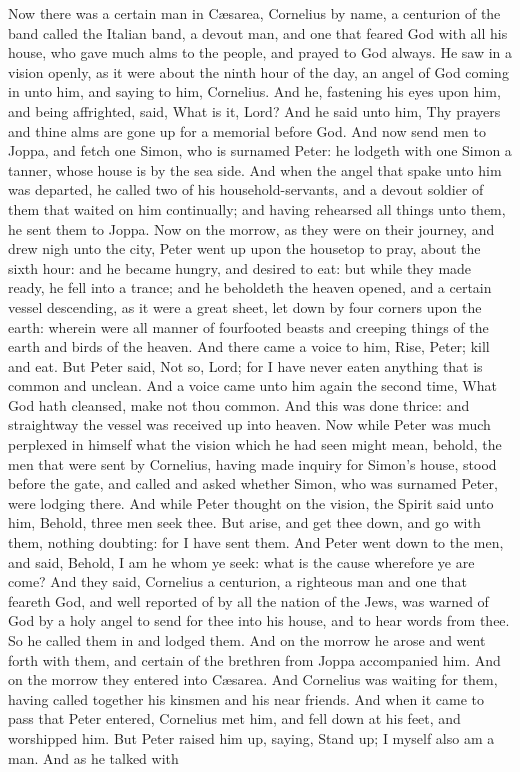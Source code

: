 Now there was a certain man in Cæsarea, Cornelius by name, a centurion of the band called the Italian band, a devout man, and one that feared God with all his house, who gave much alms to the people, and prayed to God always. He saw in a vision openly, as it were about the ninth hour of the day, an angel of God coming in unto him, and saying to him, Cornelius. And he, fastening his eyes upon him, and being affrighted, said, What is it, Lord? And he said unto him, Thy prayers and thine alms are gone up for a memorial before God. And now send men to Joppa, and fetch one Simon, who is surnamed Peter: he lodgeth with one Simon a tanner, whose house is by the sea side. And when the angel that spake unto him was departed, he called two of his household-servants, and a devout soldier of them that waited on him continually; and having rehearsed all things unto them, he sent them to Joppa.  Now on the morrow, as they were on their journey, and drew nigh unto the city, Peter went up upon the housetop to pray, about the sixth hour: and he became hungry, and desired to eat: but while they made ready, he fell into a trance; and he beholdeth the heaven opened, and a certain vessel descending, as it were a great sheet, let down by four corners upon the earth: wherein were all manner of fourfooted beasts and creeping things of the earth and birds of the heaven. And there came a voice to him, Rise, Peter; kill and eat. But Peter said, Not so, Lord; for I have never eaten anything that is common and unclean. And a voice came unto him again the second time, What God hath cleansed, make not thou common. And this was done thrice: and straightway the vessel was received up into heaven.  Now while Peter was much perplexed in himself what the vision which he had seen might mean, behold, the men that were sent by Cornelius, having made inquiry for Simon’s house, stood before the gate, and called and asked whether Simon, who was surnamed Peter, were lodging there. And while Peter thought on the vision, the Spirit said unto him, Behold, three men seek thee. But arise, and get thee down, and go with them, nothing doubting: for I have sent them. And Peter went down to the men, and said, Behold, I am he whom ye seek: what is the cause wherefore ye are come? And they said, Cornelius a centurion, a righteous man and one that feareth God, and well reported of by all the nation of the Jews, was warned of God by a holy angel to send for thee into his house, and to hear words from thee. So he called them in and lodged them. And on the morrow he arose and went forth with them, and certain of the brethren from Joppa accompanied him. And on the morrow they entered into Cæsarea. And Cornelius was waiting for them, having called together his kinsmen and his near friends. And when it came to pass that Peter entered, Cornelius met him, and fell down at his feet, and worshipped him. But Peter raised him up, saying, Stand up; I myself also am a man. And as he talked with 